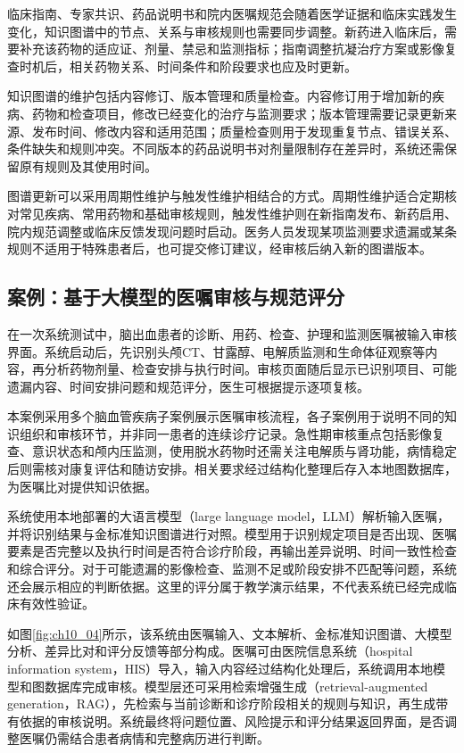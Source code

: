 临床指南、专家共识、药品说明书和院内医嘱规范会随着医学证据和临床实践发生变化，知识图谱中的节点、关系与审核规则也需要同步调整。新药进入临床后，需要补充该药物的适应证、剂量、禁忌和监测指标；指南调整抗凝治疗方案或影像复查时机后，相关药物关系、时间条件和阶段要求也应及时更新。

知识图谱的维护包括内容修订、版本管理和质量检查。内容修订用于增加新的疾病、药物和检查项目，修改已经变化的治疗与监测要求；版本管理需要记录更新来源、发布时间、修改内容和适用范围；质量检查则用于发现重复节点、错误关系、条件缺失和规则冲突。不同版本的药品说明书对剂量限制存在差异时，系统还需保留原有规则及其使用时间。

图谱更新可以采用周期性维护与触发性维护相结合的方式。周期性维护适合定期核对常见疾病、常用药物和基础审核规则，触发性维护则在新指南发布、新药启用、院内规范调整或临床反馈发现问题时启动。医务人员发现某项监测要求遗漏或某条规则不适用于特殊患者后，也可提交修订建议，经审核后纳入新的图谱版本。

\subsection{案例：基于大模型的医嘱审核与规范评分}

在一次系统测试中，脑出血患者的诊断、用药、检查、护理和监测医嘱被输入审核界面。系统启动后，先识别头颅CT、甘露醇、电解质监测和生命体征观察等内容，再分析药物剂量、检查安排与执行时间。审核页面随后显示已识别项目、可能遗漏内容、时间安排问题和规范评分，医生可根据提示逐项复核。

本案例采用多个脑血管疾病子案例展示医嘱审核流程，各子案例用于说明不同的知识组织和审核环节，并非同一患者的连续诊疗记录。急性期审核重点包括影像复查、意识状态和颅内压监测，使用脱水药物时还需关注电解质与肾功能，病情稳定后则需核对康复评估和随访安排。相关要求经过结构化整理后存入本地图数据库，为医嘱比对提供知识依据。

系统使用本地部署的大语言模型（large language model，LLM）解析输入医嘱，并将识别结果与金标准知识图谱进行对照。模型用于识别规定项目是否出现、医嘱要素是否完整以及执行时间是否符合诊疗阶段，再输出差异说明、时间一致性检查和综合评分。对于可能遗漏的影像检查、监测不足或阶段安排不匹配等问题，系统还会展示相应的判断依据。这里的评分属于教学演示结果，不代表系统已经完成临床有效性验证。

如图\ref{fig:ch10_04}所示，该系统由医嘱输入、文本解析、金标准知识图谱、大模型分析、差异比对和评分反馈等部分构成。医嘱可由医院信息系统（hospital information system，HIS）导入，输入内容经过结构化处理后，系统调用本地模型和图数据库完成审核。模型层还可采用检索增强生成（retrieval-augmented generation，RAG），先检索与当前诊断和诊疗阶段相关的规则与知识，再生成带有依据的审核说明。系统最终将问题位置、风险提示和评分结果返回界面，是否调整医嘱仍需结合患者病情和完整病历进行判断。


